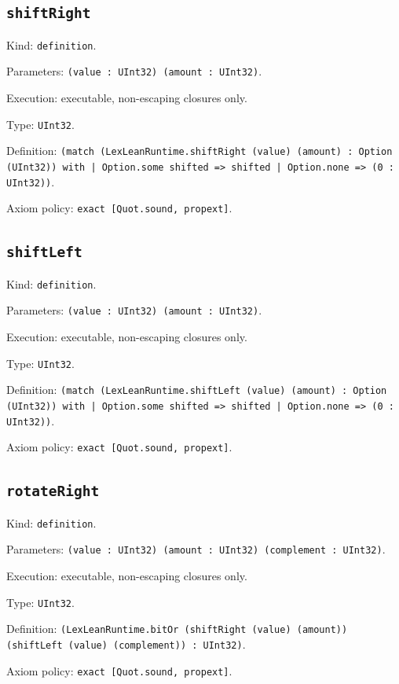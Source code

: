\documentclass[11pt]{article}
\begin{document}
\subsection*{\texttt{shiftRight}}
\noindent Kind: \texttt{definition}.\par
\noindent Parameters: \texttt{(value : UInt32) (amount : UInt32)}.\par
\noindent Execution: executable, non-escaping closures only.\par
\noindent Type: \texttt{UInt32}.\par
\noindent Definition: \texttt{(match (LexLeanRuntime.shiftRight (value) (amount) : Option (UInt32)) with | Option.some shifted => shifted | Option.none => (0 : UInt32))}.\par
\noindent Axiom policy: \texttt{exact [Quot.sound, propext]}.\par
\subsection*{\texttt{shiftLeft}}
\noindent Kind: \texttt{definition}.\par
\noindent Parameters: \texttt{(value : UInt32) (amount : UInt32)}.\par
\noindent Execution: executable, non-escaping closures only.\par
\noindent Type: \texttt{UInt32}.\par
\noindent Definition: \texttt{(match (LexLeanRuntime.shiftLeft (value) (amount) : Option (UInt32)) with | Option.some shifted => shifted | Option.none => (0 : UInt32))}.\par
\noindent Axiom policy: \texttt{exact [Quot.sound, propext]}.\par
\subsection*{\texttt{rotateRight}}
\noindent Kind: \texttt{definition}.\par
\noindent Parameters: \texttt{(value : UInt32) (amount : UInt32) (complement : UInt32)}.\par
\noindent Execution: executable, non-escaping closures only.\par
\noindent Type: \texttt{UInt32}.\par
\noindent Definition: \texttt{(LexLeanRuntime.bitOr (shiftRight (value) (amount)) (shiftLeft (value) (complement)) : UInt32)}.\par
\noindent Axiom policy: \texttt{exact [Quot.sound, propext]}.\par
\end{document}
